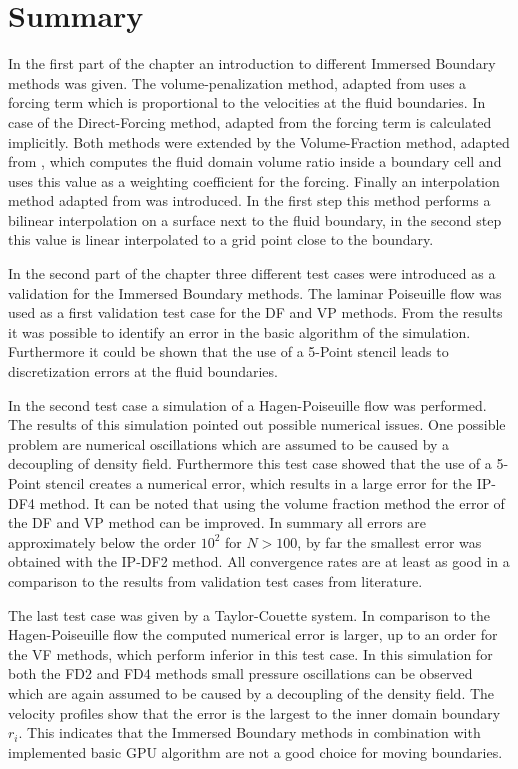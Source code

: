\clearpage

\section{Summary}

In the first part of the chapter an introduction to different Immersed Boundary methods was given.
The volume-penalization method, adapted from  \citep{Lulff2011} uses a forcing term which is proportional to the velocities at the fluid boundaries.
In case of the Direct-Forcing method, adapted from \citep{Fadlun2000} the forcing term is calculated implicitly.
Both methods were extended by the Volume-Fraction method, adapted from \citep{Fadlun2000}, which computes the fluid domain volume ratio inside a boundary
cell and uses this value as a weighting coefficient for the forcing.
Finally an interpolation method adapted from  \citep{ Gilmanov2003} was introduced. In the first step this method performs a bilinear interpolation on a surface
next to the fluid boundary, in the second step this value is linear interpolated to a grid point close to the boundary.

In the second part of the chapter three different test cases were introduced as a validation for the Immersed Boundary methods.
The laminar Poiseuille flow was used as a first validation test case for the DF and VP methods.
From the results it was possible to identify an error in the basic algorithm of the simulation.
Furthermore it could be shown that the use of a 5-Point stencil leads to discretization errors at the fluid boundaries.

In the second test case a simulation of a Hagen-Poiseuille flow was performed.
The results of this simulation pointed out possible numerical issues.
One possible problem are numerical oscillations which are assumed to be caused
by a decoupling of density field.
Furthermore this test case showed that the use of a 5-Point stencil creates a numerical error,
which results in a large error for the IP-DF4 method.
It can be noted that using the volume fraction method  the error of the DF and VP method can be improved.
In summary all errors are approximately below the order  $10^2$ for $N>100$,
by far the smallest error was obtained with the IP-DF2 method.
All convergence rates are at least as good in a comparison
to the results from validation test cases from literature.

The last test case was given by a Taylor-Couette system.
In comparison to the Hagen-Poiseuille flow the computed numerical error is larger,
up to an order for the VF methods, which perform inferior in this test case.
In this simulation for both the FD2 and FD4 methods small pressure oscillations can be observed which are again assumed to be
caused by a decoupling of the density field.
The velocity profiles show that the error is the largest to the inner domain boundary $r_i$.
This indicates that the Immersed Boundary methods in combination with implemented basic GPU algorithm
are not a good choice for moving boundaries.





